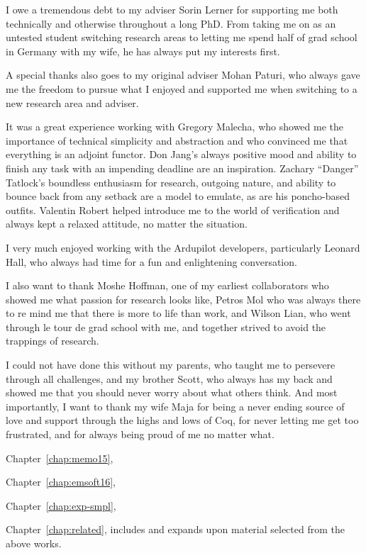\documentclass[12pt]{ucsddissertation}
\begin{document}
\begin{acknowledgements}
I owe a tremendous debt to my adviser Sorin Lerner for supporting me both
technically and otherwise throughout a long PhD. From taking me on as an
untested student switching research areas to letting me spend half of grad
school in Germany with my wife, he has always put my interests first.

A special thanks also goes to my original adviser Mohan Paturi, who always
gave me the freedom to pursue what I enjoyed and supported me when
switching to a new research area and adviser.

It was a great experience working with Gregory Malecha, who showed me the
importance of technical simplicity and abstraction and who convinced me
that everything is an adjoint functor. Don Jang's always positive mood and
ability to finish any task with an impending deadline are an inspiration.
Zachary ``Danger'' Tatlock's boundless enthusiasm for research, outgoing
nature, and ability to bounce back from any setback are a model to emulate,
as are his poncho-based outfits. Valentin Robert helped introduce me to the
world of verification and always kept a relaxed attitude, no matter the
situation.

I very much enjoyed working with the Ardupilot developers, particularly
Leonard Hall, who always had time for a fun and enlightening conversation.

I also want to thank Moshe Hoffman, one of my earliest collaborators who
showed me what passion for research looks like, Petros Mol who was always
there to re mind me that there is more to life than work, and Wilson Lian,
who went through le tour de grad school with me, and together strived to
avoid the trappings of research.

I could not have done this without my parents, who taught me to persevere
through all challenges, and my brother Scott, who always has my back and
showed me that you should never worry about what others think. And most
importantly, I want to thank my wife Maja for being a never ending source
of love and support through the highs and lows of Coq, for never letting me
get too frustrated, and for always being proud of me no matter what.

Chapter~\ref{chap:memo15}, \memoack{}

Chapter~\ref{chap:emsoft16}, \emsoftack{}

Chapter~\ref{chap:exp-smpl}, \expsmplack{}

Chapter~\ref{chap:related}, includes and expands upon material selected
from the above works.
\end{acknowledgements}
\end{document}
